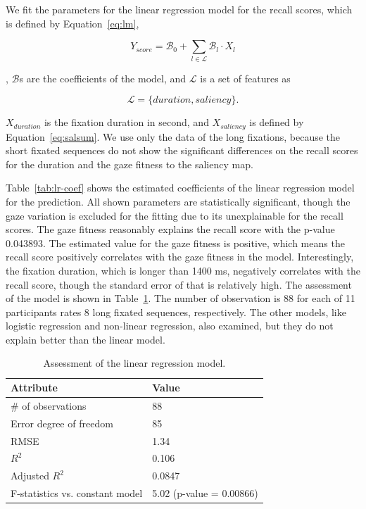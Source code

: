 \documentclass[oneside,master]{snueethesis}
\begin{document}
We fit the parameters for the linear regression model for the recall scores, which is defined by Equation~\ref{eq:lm},

\begin{equation}\label{eq:lm}
Y_{score} = \mathcal{B}_{0} + \sum_{l \in \mathcal{L}} \mathcal{B}_{l} \cdot X_{l}
\end{equation}

\noindent, $\mathcal{B}$s are the coefficients of the model, and $\mathcal{L}$ is a set of features as  

\begin{equation}\label{eq:l}
\mathcal{L} = \{duration, saliency\}.
\end{equation}

$X_{duration}$ is the fixation duration in second, and $X_{saliency}$ is defined by Equation~\ref{eq:salsum}. We use only the data of the long fixations, because the short fixated sequences do not show the significant differences on the recall scores for the duration and the gaze fitness to the saliency map.

Table~\ref{tab:lr-coef} shows the estimated coefficients of the linear regression model for the prediction. All shown parameters are statistically significant, though the gaze variation is excluded for the fitting due to its unexplainable for the recall scores. The gaze fitness reasonably explains the recall score with the p-value 0.043893. The estimated value for the gaze fitness is positive, which means the recall score positively correlates with the gaze fitness in the model. Interestingly, the fixation duration, which is longer than 1400 ms, negatively correlates with the recall score, though the standard error of that is relatively high. The assessment of the model is shown in Table~\ref{tab:lr-goodness}. The number of observation is 88 for each of 11 participants rates 8 long fixated sequences, respectively. The other models, like logistic regression and non-linear regression, also examined, but they do not explain better than the linear model.



\begin{table}[!ht]
\begin{center} 
\caption{Assessment of the linear regression model.} 
\vskip 0.12in
\label{tab:lr-goodness} 
\begin{tabular}{ll} 
\hline
Attribute   & Value \\ 
\hline
\# of observations & 88 \\
Error degree of freedom & 85 \\
RMSE & 1.34 \\
$R^{2}$ & 0.106 \\
Adjusted $R^{2}$ & 0.0847 \\
F-statistics vs. constant model & 5.02 (p-value = 0.00866) \\
\hline
\end{tabular} 
\end{center} 
\end{table}
\end{document}
